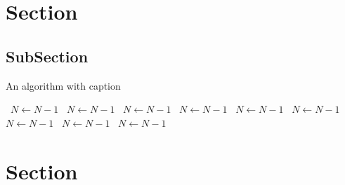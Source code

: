 \documentclass[a4paper]{article}
\begin{document}
\section{Section}

\subsection{SubSection}

\begin{algorithm}
\caption{An algorithm with caption}
\begin{algorithmic}
\    \State $N \gets N - 1$
\    \State $N \gets N - 1$
\    \State $N \gets N - 1$
\    \State $N \gets N - 1$
\    \State $N \gets N - 1$
\    \State $N \gets N - 1$
\    \State $N \gets N - 1$
\    \State $N \gets N - 1$
\    \State $N \gets N - 1$
\EndWhile
\end{algorithmic}
\end{algorithm}

\section{Section}
\end{document}
